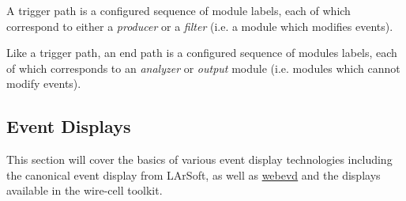 \documentclass[8pt]{refart}
\begin{document}







 A trigger path is a configured sequence of module labels, each of which correspond to either a \textit{producer} or a \textit{filter} (i.e. a module which modifies events).

 Like a trigger path, an end path is a configured sequence of modules labels, each of which corresponds to an \textit{analyzer} or \textit{output} module (i.e. modules which cannot modify events).


\subsection{Event Displays}\label{eventdisplays}
This section will cover the basics of various event display technologies including the canonical event display from LArSoft, as well as \hyperref[webevd]{webevd} and the displays available in the wire-cell toolkit.
\end{document}
